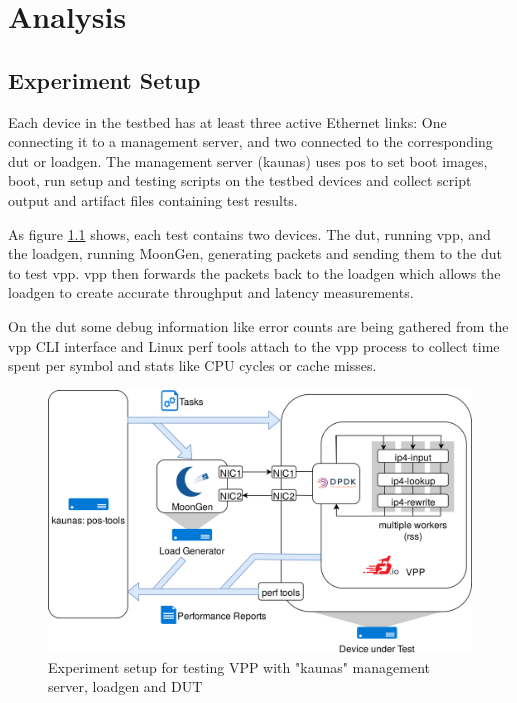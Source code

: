 
\chapter{Analysis}


\section{Experiment Setup}

Each device in the testbed has at least three active Ethernet links:
One connecting it to a management server, and two connected to the
corresponding \Ac{dut} or \Ac{loadgen}. The management server (kaunas)
uses \Ac{pos} \cite{GallScho18} to set boot images, boot, run setup
and testing scripts on the testbed devices and collect script output
and artifact files containing test results.

As figure \ref{setup} shows, each test contains two devices. The
\Ac{dut}, running \Ac{vpp}, and the \Ac{loadgen}, running MoonGen,
generating packets and sending them to the \Ac{dut} to test \Ac{vpp}.
\Ac{vpp} then forwards the packets back to the \Ac{loadgen} which
allows the \Ac{loadgen} to create accurate throughput and latency
measurements.

On the \Ac{dut} some debug information like error counts are being
gathered from the \Ac{vpp} CLI interface and Linux perf tools
\cite{perf} attach to the \Ac{vpp} process to collect time spent per
symbol and stats like CPU cycles or cache misses.

\begin{figure}[!ht]
\noindent\hspace{0.5mm}\includegraphics[width=\linewidth]{pics/topology.png}
\caption{Experiment setup for testing VPP with "kaunas" management server, \Ac{loadgen} and DUT}
\label{setup}
\end{figure}


